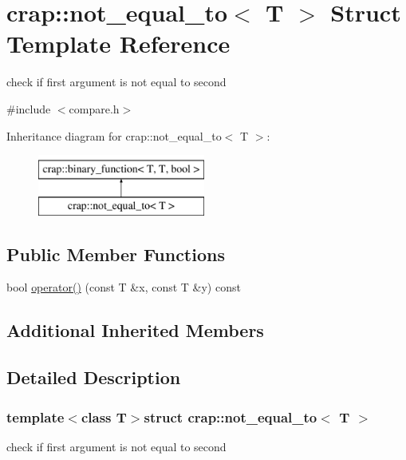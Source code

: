 \hypertarget{structcrap_1_1not__equal__to}{\section{crap\-:\-:not\-\_\-equal\-\_\-to$<$ T $>$ Struct Template Reference}
\label{structcrap_1_1not__equal__to}
}


check if first argument is not equal to second  




{\ttfamily \#include $<$compare.\-h$>$}

Inheritance diagram for crap\-:\-:not\-\_\-equal\-\_\-to$<$ T $>$\-:\begin{figure}[H]
\begin{center}
\leavevmode
\includegraphics[height=2.000000cm]{structcrap_1_1not__equal__to}
\end{center}
\end{figure}
\subsection*{Public Member Functions}
\begin{DoxyCompactItemize}
\item 
bool \hyperlink{structcrap_1_1not__equal__to_a78f192be774943891bbe2bf725108bd7}{operator()} (const T \&x, const T \&y) const 
\end{DoxyCompactItemize}
\subsection*{Additional Inherited Members}


\subsection{Detailed Description}
\subsubsection*{template$<$class T$>$struct crap\-::not\-\_\-equal\-\_\-to$<$ T $>$}

check if first argument is not equal to second 

